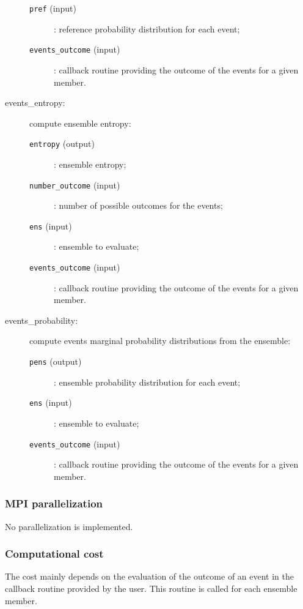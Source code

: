 \documentclass[11pt]{article}
\begin{document}
\begin{description}
\begin{description}
  \item[{\tt pref} (input)]: reference probability distribution for each event;
  \item[{\tt events\_outcome} (input)]: callback routine providing the outcome
                                        of the events for a given member.
  \end{description}
\item[events\_entropy:] compute ensemble entropy:
  \begin{description}
  \item[{\tt entropy} (output)]: ensemble entropy;
  \item[{\tt number\_outcome} (input)]: number of possible outcomes for the events;
  \item[{\tt ens} (input)]: ensemble to evaluate;
  \item[{\tt events\_outcome} (input)]: callback routine providing the outcome
                                        of the events for a given member.
  \end{description}
\item[events\_probability:] compute events marginal probability distributions from the ensemble:
  \begin{description}
  \item[{\tt pens} (output)]: ensemble probability distribution for each event;
  \item[{\tt ens} (input)]: ensemble to evaluate;
  \item[{\tt events\_outcome} (input)]: callback routine providing the outcome
                                        of the events for a given member.
  \end{description}
\end{description}

\subsubsection*{MPI parallelization}

No parallelization is implemented.

\subsubsection*{Computational cost}

The cost mainly depends on the evaluation of the outcome of an event
in the callback routine provided by the user.
This routine is called for each ensemble member.
\end{document}
